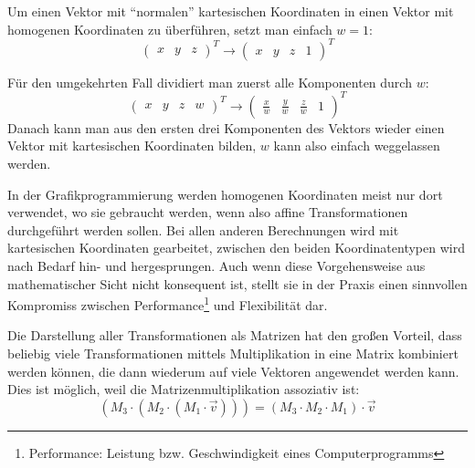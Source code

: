 Um einen Vektor mit \enquote{normalen} kartesischen Koordinaten in einen Vektor mit homogenen Koordinaten zu überführen, setzt man einfach $w = 1$:
\begin{equation}
 \begin{pmatrix} x & y & z \end{pmatrix}^T \rightarrow \begin{pmatrix} x & y & z & 1 \end{pmatrix}^T
\end{equation}

Für den umgekehrten Fall dividiert man zuerst alle Komponenten durch $w$:
\begin{equation}
 \begin{pmatrix} x & y & z & w \end{pmatrix}^T \rightarrow \begin{pmatrix} \frac{x}{w} & \frac{y}{w} & \frac{z}{w} & 1 \end{pmatrix}^T
\end{equation}
Danach kann man aus den ersten drei Komponenten des Vektors wieder einen Vektor mit kartesischen Koordinaten bilden, $w$ kann also einfach weggelassen werden. 

In der Grafikprogrammierung werden homogenen Koordinaten meist nur dort verwendet, wo sie gebraucht werden, wenn also affine Transformationen durchgeführt werden sollen. Bei allen anderen Berechnungen wird mit kartesischen Koordinaten gearbeitet, zwischen den beiden Koordinatentypen wird nach Bedarf hin- und hergesprungen. Auch wenn diese Vorgehensweise aus mathematischer Sicht nicht konsequent ist, stellt sie in der Praxis einen sinnvollen Kompromiss zwischen Performance\footnote{Performance: Leistung bzw. Geschwindigkeit eines Computerprogramms} und Flexibilität dar.

\label{transformationmatrixcombination}
Die Darstellung aller Transformationen als Matrizen hat den großen Vorteil, dass beliebig viele Transformationen mittels Multiplikation in eine Matrix kombiniert werden können, die dann wiederum auf viele Vektoren angewendet werden kann. Dies ist möglich, weil die Matrizenmultiplikation assoziativ ist:
\begin{equation}
 \left( M_3 \cdot \left( M_2 \cdot \left( M_1 \cdot \vec v \right) \right) \right) = \left( M_3 \cdot M_2 \cdot M_1 \right) \cdot \vec v
\end{equation} 

